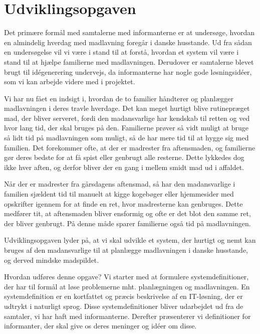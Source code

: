 \section{Udviklingsopgaven}
\label{sec:udviklingsopaven}

Det primære formål med samtalerne med informanterne er at undersøge, hvordan en almindelig hverdag med madlavning foregår i danske husstande. Ud fra sådan en undersøgelse vil vi være i stand til at forstå, hvordan et system vil være i stand til at hjælpe familierne med madlavningen. Derudover er samtalerne blevet brugt til idégenerering undervejs, da informanterne har nogle gode løsningsidéer, som vi kan arbejde videre med i projektet. 

Vi har nu fået en indsigt i, hvordan de to familier håndterer og planlægger madlavningen i deres travle hverdage. Det kan meget hurtigt blive rutinepræget mad, der bliver serveret, fordi den madansvarlige har kendskab til retten og ved hvor lang tid, der skal bruges på den. Familierne prøver så vidt muligt at bruge så lidt tid på madlavningen som muligt, så de har mere tid til at hygge sig med familien. Det forekommer ofte, at der er madrester fra aftensmaden, og familierne gør deres bedste for at få spist eller genbrugt alle resterne. Dette lykkedes dog ikke hver aften, og derfor bliver der en gang i mellem smidt mad ud i affaldet. 

Når der er madrester fra gårsdagens aftensmad, så har den madansvarlige i familien sjældent tid til manuelt at kigge kogebøger eller hjemmesider med opskrifter igennem for at finde en ret, hvor madresterne kan genbruges. Dette medfører tit, at aftensmaden bliver ensformig og ofte er det blot den samme ret, der bliver genbrugt. På denne måde sparer familierne også tid på madlavningen.

Udviklingsopgaven lyder på, at vi skal udvikle et system, der hurtigt og nemt kan bruges af den madansvarlige til at planlægge madlavningen i danske husstande, og derved mindske madspildet. 

Hvordan udføres denne opgave? Vi starter med at formulere systemdefinitioner, der har til formål at løse problemerne mht. planlægningen og madlavningen. En systemdefinition er en kortfattet og præcis beskrivelse af en IT-løsning, der er udtrykt i naturligt sprog. Disse systemdefinitioner bliver udarbejdet ud fra de samtaler, vi har haft med informanterne. Derefter præsenterer vi definitioner for informanter, der skal give os deres meninger og idéer om disse.
